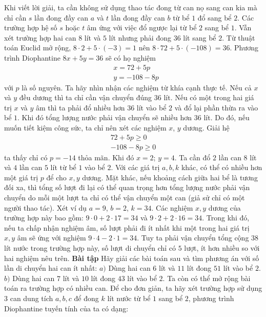\begin{multicols}{2}
	\vskip 0.1cm
	Khi viết lời giải, ta cần không sử dụng thao tác đong từ can nọ sang can kia mà chỉ cần $s$ lần đong đầy can $a$ và $t$ lần đong đầy can $b$ từ bể $1$ đổ sang bể $2$. Các trường hợp hệ số $s$ hoặc $t$ âm ứng với việc đổ ngược lại từ bể $2$ sang bể $1$.
	\vskip 0.1cm
	Vẫn xét trường hợp hai can $8$ lít và $5$ lít nhưng phải đong $36$ lít sang bể $2$. Từ thuật toán Euclid mở rộng, $8\cdot 2+5\cdot (-3)=1$ nên $8\cdot 72+5\cdot (-108)=36$. Phương trình Diophantine $8x+5y=36$ sẽ có họ nghiệm 
	\begin{align*}
		&x=72+5p\\
		&y=-108-8p
	\end{align*}
	với $p$ là số nguyên.
	\vskip 0.1cm
	Ta hãy nhìn nhận các nghiệm từ khía cạnh thực tế. Nếu cả $x$ và $y$ đều dương thì ta chỉ cần vận chuyển đúng $36$ lít. Nếu có một trong hai giá trị $x$ và $y$ âm thì ta phải đổ nhiều hơn $36$ lít vào bể $2$ và đổ lại phần thừa ra vào bể $1$. Khi đó tổng lượng nước phải vận chuyển sẽ nhiều hơn $36$ lít. Do đó, nếu muốn tiết kiệm công sức, ta chỉ nên xét các nghiệm $x$, $y$ dương. 
	\vskip 0.1cm
	Giải hệ
	\begin{align*}
		72+5p \ge 0\\
		-108-8p\ge 0
	\end{align*}
	ta thấy chỉ có $p=-14$ thỏa mãn. Khi đó $x=2$; $y=4$. Ta cần đổ $2$ lần can $8$ lít và $4$ lần can $5$ lít từ bể $1$ vào bể $2$. Với các giá trị $a,b,k$ khác, có thể có nhiều hơn một giá trị $p$ để cho $x,y$ dương.
	\vskip 0.1cm
	Mặt khác, nếu khoảng cách giữa hai bể là tương đối xa, thì tổng số lượt đi lại có thể quan trọng hơn tổng lượng nước phải vận chuyển do mỗi một lượt ta chỉ có thể vận chuyển một can (giả sử chỉ có một người thao tác). Xét ví dụ $a=9$, $b=2$, $k=34$. Các nghiệm $x,y$ dương của trường hợp này bao gồm: $9\cdot 0+2\cdot 17=34$ và $9\cdot 2+2\cdot 16=34$.
	\vskip 0.1cm
	Trong khi đó, nếu ta chấp nhận nghiệm âm, số lượt phải đi ít nhất khi một trong hai giá trị $x,y$ âm sẽ ứng với nghiệm $9\cdot 4-2\cdot 1=34$. Tuy ta phải vận chuyển tổng cộng $38$ lít nước trong trường hợp này, số lượt di chuyển chỉ có $5$ lượt, ít hơn nhiều so với hai nghiệm nêu trên.
	\vskip 0.1cm
	\textbf{\color{hoccungpi}Bài tập}
	\vskip 0.1cm
	Hãy giải các bài toán sau và tìm phương án với số lần di chuyển hai can ít nhất:
	\vskip 0.1cm
	$a)$ Dùng hai can $6$ lít và $11$ lít đong $51$ lít vào bể $2$.
	\vskip 0.1cm
	$b)$ Dùng hai can $7$ lít và $10$ lít đong $43$ lít vào bể $2$.
	\vskip 0.1cm
	Ta còn có thể mở rộng bài toán ra trường hợp có nhiều can. Để cho đơn giản, ta hãy xét trường hợp sử dụng $3$ can dung tích $a,b,c$ để đong $k$ lít nước từ bể $1$ sang bể $2$, phương trình Diophantine tuyến tính của ta có dạng:

\end{multicols}
